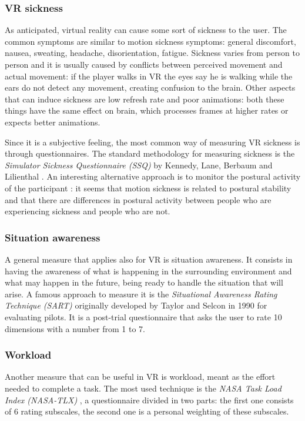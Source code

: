 \documentclass[binding=0.6cm,LaM]{sapthesis}
\begin{document}
\subsubsection{VR sickness}
As anticipated, virtual reality can cause some sort of sickness to the user. The common symptoms are similar to motion sickness symptoms: general discomfort, nausea, sweating, headache, disorientation, fatigue.
Sickness varies from person to person and it is usually caused by conflicts between perceived movement and actual movement: if the player walks in VR the eyes say he is walking while the ears do not detect any movement, creating confusion to the brain. Other aspects that can induce sickness are low refresh rate and poor animations: both these things have the same effect on brain, which processes frames at higher rates or expects better animations.

Since it is a subjective feeling, the most common way of measuring VR sickness is through questionnaires. The standard methodology for measuring sickness is the \textit{Simulator Sickness Questionnaire (SSQ)} by Kennedy, Lane, Berbaum and Lilienthal \cite{kennedy1993simulator}. 
An interesting alternative approach is to monitor the postural activity of the participant \cite{riccio1991ecological}: it seems that motion sickness is related to postural stability and that there are differences in postural activity between people who are experiencing sickness and people who are not.

\subsubsection{Situation awareness}
A general measure that applies also for VR is situation awareness. It consists in having the awareness of what is happening in the surrounding environment and what may happen in the future, being ready to handle the situation that will arise. A famous approach to measure it is the \textit{Situational Awareness Rating Technique (SART)} \cite{selcon1990evaluation} originally developed by Taylor and Selcon in 1990 for evaluating pilots. It is a post-trial questionnaire that asks the user to rate 10 dimensions with a number from 1 to 7.

\subsubsection{Workload}
Another measure that can be useful in VR is workload, meant as the effort needed to complete a task. The most used technique is the
\textit{NASA Task Load Index (NASA-TLX)} \cite{hart1988development}, a questionnaire divided in two parts: the first one consists of 6 rating subscales, the second one is a personal weighting of these subscales.
\end{document}
